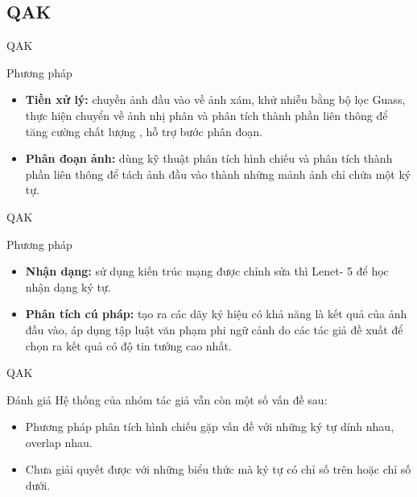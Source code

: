 \documentclass{beamer}
\begin{document}
\subsection{QAK}
\begin{frame}{QAK}
	\begin{block}{Phương pháp}
		\begin{itemize}
			\item \textbf{Tiền xử lý:} chuyền ảnh đầu vào về ảnh xám, khử nhiễu bằng bộ lọc Guass, thực hiện chuyển về ảnh nhị phân và phân tích thành phần liên thông để tăng cường chất lượng , hỗ trợ bước phân đoạn.
			\item \textbf{Phân đoạn ảnh:} dùng kỹ thuật phân tích hình chiếu và phân tích thành phần liên thông để tách ảnh đầu vào thành những mảnh ảnh chỉ chứa một ký tự.
		\end{itemize}
	\end{block}
\end{frame}

\begin{frame}{QAK}
\begin{block}{Phương pháp}
	\begin{itemize}
		\item \textbf{Nhận dạng:} sử dụng kiến trúc mạng được chỉnh sửa thì Lenet- 5 để học nhận dạng ký tự.
		\item \textbf{Phân tích cú pháp:} tạo ra các dãy ký hiệu có khả năng là kết quả của ảnh đầu vào, áp dụng tập luật văn phạm phi ngữ cảnh do các tác giả đề xuất để chọn ra kết quả có độ tin tưởng cao nhất.
	\end{itemize}
\end{block}
\end{frame}

\begin{frame}{QAK}
	\begin{block}{Đánh giá}
		Hệ thống của nhóm tác giả vẫn còn một số vấn đề sau:
		\begin{itemize}
			\item Phương pháp phân tích hình chiếu gặp vấn đề với những ký tự dính nhau, overlap nhau.
			\item Chưa giải quyết được với những biểu thức mà ký tự có chỉ số trên hoặc chỉ số dưới. 
		\end{itemize}
	\end{block}
\end{frame}
\end{document}
